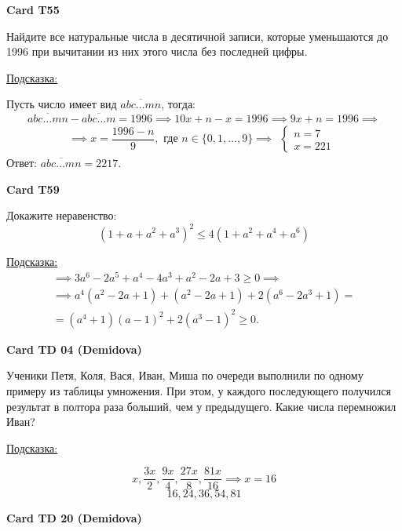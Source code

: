 \documentclass[12pt,a4paper]{article}
\begin{document}
\bigskip
{}
\noindent\textbf{Card T55}
\medskip  
{} 

Найдите все натуральные числа в десятичной записи, которые уменьшаются до 1996 при вычитании из них этого числа без последней цифры.

\medskip
\noindent \underline{Подсказка:}

Пусть число имеет вид \( \overline{abc\ldots mn} \), тогда:
\[
\overline{abc\ldots mn} - \overline{abc\ldots m} = 1996 \implies 10x + n - x = 1996 \implies 9x + n = 1996\implies
\]
\[\implies x = \frac{1996 - n}{9}, \textrm{ \ где \ }  n \in \{0, 1, \ldots, 9\}\implies
\begin{array}{l}
\left\{\begin{array}{l}
n=7\\
x=221		
\end{array}\right.
\end{array} 
\]
Ответ: \( \overline{abc\ldots mn} = 2217 \).

\bigskip
{}
\noindent\textbf{Card T59}
\medskip  
{}

Докажите неравенство:
\[
(1 + a + a^2 + a^3)^2 \leq 4(1 + a^2 + a^4 + a^6)
\]

\medskip
\noindent \underline{Подсказка:}
\[
\begin{array}{l}
	\implies 3a^6 - 2a^5 + a^4 - 4a^3 + a^2 - 2a + 3 \geq 0	\implies\\
	\implies a^4(a^2 - 2a + 1) + (a^2 - 2a + 1) + 2(a^6 - 2a^3 + 1) =\\	
	=	(a^4 + 1)(a-1)^2 + 2 (a^3-1)^2 \geq 0	.
\end{array}
\]	

\bigskip
{}
\noindent\textbf{Card TD 04 (Demidova)}
\medskip
{}

	Ученики Петя, Коля, Вася, Иван, Миша по очереди выполнили по одному примеру из таблицы умножения. При этом, у каждого последующего получился результат в полтора раза больший, чем у предыдущего. Какие числа перемножил Иван?

\underline{Подсказка:}

$$x,  \frac{3x}{2},  \frac{9x}{4}, \frac{27x}{8}, \frac{81x}{16}  \implies  x=16$$
$$16, 24, 36, 54, 81$$

\bigskip
{}
\noindent\textbf{Card TD 20 (Demidova)}
\medskip
{}
\end{document}
